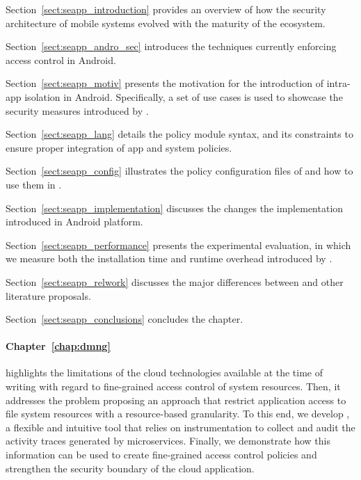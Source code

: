 \begin{compactitem}
    \item Section~\ref{sect:seapp_introduction} provides an overview
     of how the security architecture of mobile systems evolved with
     the maturity of the ecosystem.
    \item Section~\ref{sect:seapp_andro_sec} introduces the techniques
     currently enforcing access control in Android.
    \item Section~\ref{sect:seapp_motiv} presents the motivation for
     the introduction of intra-app isolation in Android. Specifically,
     a set of use cases is used to showcase the security measures
     introduced by \seapp.
    \item Section~\ref{sect:seapp_lang} details the \seapp policy
     module syntax, and its constraints to ensure proper integration
     of app and system policies.
    \item Section~\ref{sect:seapp_config} illustrates the policy 
     configuration files of \sea and how to use them in \seapp.
    \item Section~\ref{sect:seapp_implementation} discusses the
     changes the \seapp implementation introduced in Android platform.
    \item Section~\ref{sect:seapp_performance} presents the
     experimental evaluation, in which we measure both the
     installation time and runtime overhead introduced by \seapp.
    \item Section~\ref{sect:seapp_relwork} discusses the major
     differences between \seapp and other literature proposals.
    \item Section~\ref{sect:seapp_conclusions} concludes the chapter.
\end{compactitem}
\medskip

\paragraph*{Chapter~\ref{chap:dmng}} highlights the limitations of
the cloud technologies available at the time of writing with regard to
fine-grained access control of system resources. Then, it addresses
the problem proposing an approach that restrict application access to
file system resources with a resource-based granularity. To this end,
we develop \dmng, a flexible and intuitive tool that relies on
instrumentation to collect and audit the activity traces generated by
microservices. Finally, we demonstrate how this information can be
used to create fine-grained access control policies and strengthen the
security boundary of the cloud application.

